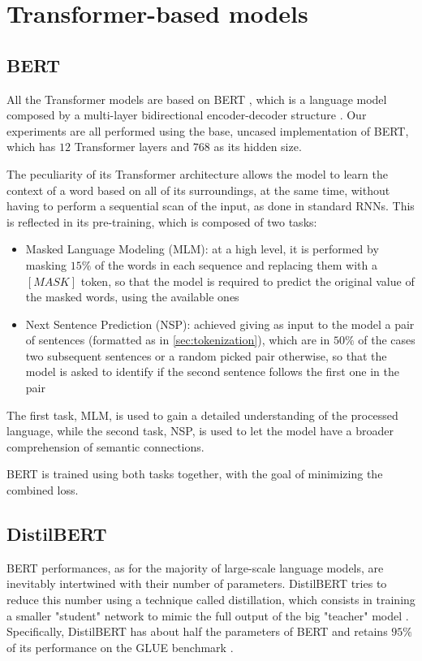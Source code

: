 \documentclass[a4paper,10pt]{report}
\begin{document}
\section{Transformer-based models}\label{sec:transformer-models}
\subsection{BERT}\label{subsec:bert-model}
All the Transformer models are based on BERT \cite{bert}, which is a language model composed by a multi-layer bidirectional encoder-decoder structure \cite{transformers}. Our experiments are all performed using the base, uncased implementation of BERT, which has $12$ Transformer layers and $768$ as its hidden size.

The peculiarity of its Transformer architecture allows the model to learn the context of a word based on all of its surroundings, at the same time, without having to perform a sequential scan of the input, as done in standard RNNs. This is reflected in its pre-training, which is composed of two tasks:
\begin{itemize}
  \item Masked Language Modeling (MLM): at a high level, it is performed by masking $15\%$ of the words in each sequence and replacing them with a $[MASK]$ token, so that the model is required to predict the original value of the masked words, using the available ones
  \item Next Sentence Prediction (NSP): achieved giving as input to the model a pair of sentences (formatted as in \ref{sec:tokenization}), which are in $50\%$ of the cases two subsequent sentences or a random picked pair otherwise, so that the model is asked to identify if the second sentence follows the first one in the pair
\end{itemize}
The first task, MLM, is used to gain a detailed understanding of the processed language, while the second task, NSP, is used to let the model have a broader comprehension of semantic connections.

BERT is trained using both tasks together, with the goal of minimizing the combined loss.

\subsection{DistilBERT}\label{subsec:distilbert-model}
BERT performances, as for the majority of large-scale language models, are inevitably intertwined with their number of parameters. DistilBERT \cite{distilbert,distilbert-article} tries to reduce this number using a technique called distillation, which consists in training a smaller "student" network to mimic the full output of the big "teacher" model \cite{distillation}. Specifically, DistilBERT has about half the parameters of BERT and retains $95\%$ of its performance on the GLUE benchmark \cite{glue}.
\end{document}
